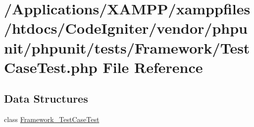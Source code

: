 \hypertarget{_test_case_test_8php}{}\section{/\+Applications/\+X\+A\+M\+P\+P/xamppfiles/htdocs/\+Code\+Igniter/vendor/phpunit/phpunit/tests/\+Framework/\+Test\+Case\+Test.php File Reference}
\label{_test_case_test_8php}
\subsection*{Data Structures}
\begin{DoxyCompactItemize}
\item 
class \mbox{\hyperlink{class_framework___test_case_test}{Framework\+\_\+\+Test\+Case\+Test}}
\end{DoxyCompactItemize}
